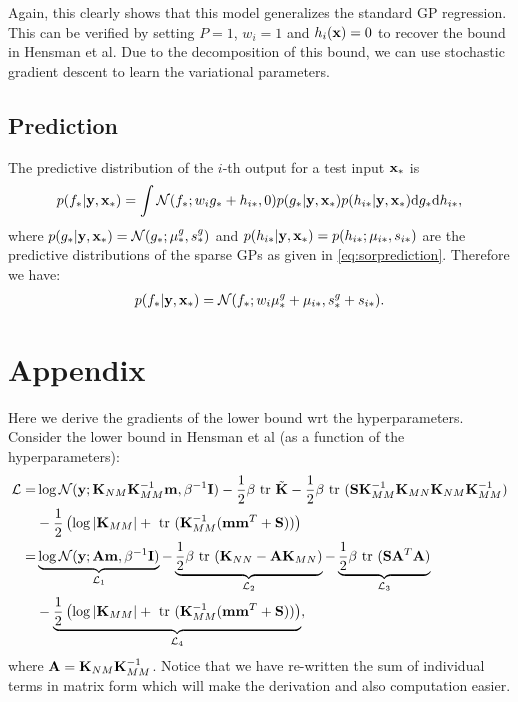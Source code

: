 \documentclass{article} %
\begin{document}
\noindent Again, this clearly shows that this model generalizes the standard GP regression. This can be verified by setting $P = 1$, $w_i = 1$ and $h_i(\mathbf{x}) = 0$ to recover the bound in Hensman et al.
Due to the decomposition of this bound, we can use stochastic gradient descent to learn the variational parameters.

\subsection{Prediction}
The predictive distribution of the $i$-th output for a test input $\mathbf{x}_*$ is 
\begin{align}
p(f_* | \mathbf{y}, \mathbf{x}_*) = \int \mathcal{N}(f_*; w_i g_* + h_{i*}, 0) p(g_* | \mathbf{y}, \mathbf{x}_*) p(h_{i*} | \mathbf{y}, \mathbf{x}_*) \mathrm{d} g_* \mathrm{d} h_{i*},
\end{align}
where $p(g_* | \mathbf{y}, \mathbf{x}_*) = \mathcal{N}(g_*; \mu^g_*, s^g_*)$ and $p(h_{i*} | \mathbf{y}, \mathbf{x}_*) = p(h_{i*}; \mu_{i*}, s_{i*})$ are the predictive distributions of the sparse GPs as given in \ref{eq:sorprediction}.
Therefore we have:
\begin{align}
p(f_* | \mathbf{y}, \mathbf{x}_*) = \mathcal{N}(f_*; w_i \mu^g_* + \mu_{i*}, s^g_* + s_{i*}). 
\end{align}


\section{Appendix}
Here we derive the gradients of the lower bound wrt the  hyperparameters.
Consider the lower bound in Hensman et al (as a function of the hyperparameters):
\begin{align}
\nonumber
\mathcal{L}
=& \log \mathcal{N}(\mathbf{y}; \mathbf{K}_{NM} \mathbf{K}_{MM}^{-1} \mathbf{m}, \beta^{-1}\mathbf{I})
 - \frac{1}{2} \beta \mbox{ \rm tr } \tilde{\mathbf{K}}
 - \frac{1}{2} \beta \mbox{ \rm tr } (\mathbf{S}\mathbf{K}_{MM}^{-1} \mathbf{K}_{MN} \mathbf{K}_{NM} \mathbf{K}_{MM}^{-1}) \\  \nonumber
&- \frac{1}{2} \left( \log |\mathbf{K}_{MM}| + \mbox{ \rm tr }(\mathbf{K}_{MM}^{-1}(\mathbf{m} \mathbf{m}^T + \mathbf{S})) \right) \\ \nonumber
=& \underbrace{\log \mathcal{N}(\mathbf{y}; \mathbf{A} \mathbf{m}, \beta^{-1}\mathbf{I})}_{\mathcal{L}_1}
 - \underbrace{\frac{1}{2} \beta \mbox{ \rm tr } (\mathbf{K}_{NN} - \mathbf{A}\mathbf{K}_{MN})}_{\mathcal{L}_2}
 - \underbrace{\frac{1}{2} \beta \mbox{ \rm tr } (\mathbf{S}\mathbf{A}^T\mathbf{A})}_{\mathcal{L}_3} \\  
&- \underbrace{\frac{1}{2} \left( \log |\mathbf{K}_{MM}| + \mbox{ \rm tr }(\mathbf{K}_{MM}^{-1}(\mathbf{m} \mathbf{m}^T + \mathbf{S})) \right)}_{\mathcal{L}_4},
\end{align}
where $\mathbf{A} = \mathbf{K}_{NM} \mathbf{K}_{MM}^{-1}$.
Notice that we have re-written the sum of individual terms in matrix form which will make the derivation and also computation easier.
\end{document}
